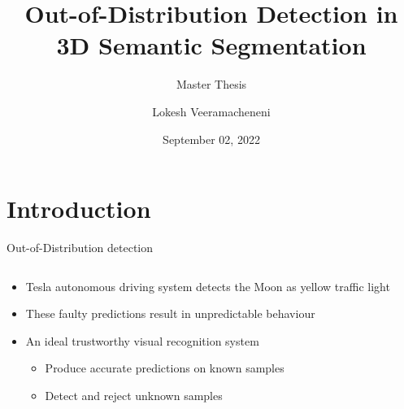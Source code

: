\documentclass[aspectratio=169]{beamer}
\author[Veeramacheneni]{Lokesh Veeramacheneni}
\title{Out-of-Distribution Detection in 3D Semantic Segmentation}
\subtitle{Master Thesis}
\institute[HBRS]{Hochschule Bonn-Rhein-Sieg}
\date{September 02, 2022}
\begin{document}
{
\begin{frame}
\titlepage
\end{frame}
}

\section{Introduction}
\begin{frame}{Out-of-Distribution detection}
    \begin{columns}
        \begin{column}{0.5\textwidth}
            \begin{itemize}
                \item Tesla autonomous driving system detects the Moon as yellow traffic light
                \item These faulty predictions result in unpredictable behaviour
                \item An ideal trustworthy visual recognition system
                \begin{itemize}
                    \item Produce accurate predictions on known samples
                    \item Detect and reject unknown samples
                \end{itemize}
            \end{itemize}
        \end{column}
        \begin{column}{0.5\textwidth}
            

\end{column}
\end{columns}
\end{frame}
\end{document}
